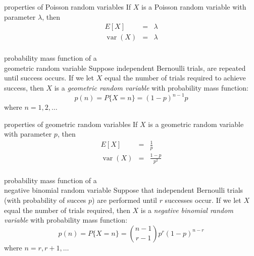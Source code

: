 \documentclass[avery5371,grid]{flashcards}
\DeclareMathOperator{\var}{var}
\begin{document}
\begin{flashcard}[Theorem]{properties of Poisson random variables}
If $X$ is a Poisson random variable with parameter $\lambda$, then
\begin{eqnarray*}
E[X] &=& \lambda \\
\var(X) &=& \lambda \\
\end{eqnarray*}
\end{flashcard}

\begin{flashcard}[Definition]{probability mass function of a \\
geometric random variable}
Suppose independent Bernoulli trials, are repeated until success
occurs.  If we let $X$ equal the number of trials required to
achieve success, then $X$ is a \textit{geometric random variable}
with probability mass function:
\begin{displaymath}
p(n) = P \lbrace X = n \rbrace = (1-p)^{n-1}p
\end{displaymath}
where $n=1,2,\ldots$
\end{flashcard}

\begin{flashcard}[Theorem]{properties of geometric random variables}
If $X$ is a geometric random variable with parameter $p$, then
\begin{eqnarray*}
E[X] &=& \frac{1}{p} \\
\var(X) &=& \frac{1-p}{p^2} \\
\end{eqnarray*}
\end{flashcard}

\begin{flashcard}[Definition]{probability mass function of a \\
negative binomial random variable}
Suppose that independent Bernoulli trials (with probability of succes $p$)
are performed until $r$ successes occur.
If we let $X$ equal the number of trials required, then $X$ is a
\textit{negative binomial random variable} with probability mass function:
\begin{displaymath}
p(n) = P \lbrace X = n \rbrace =
{n-1 \choose r-1} p^r(1-p)^{n-r}
\end{displaymath}
where $n = r, r+1,\ldots$
\end{flashcard}
\end{document}
